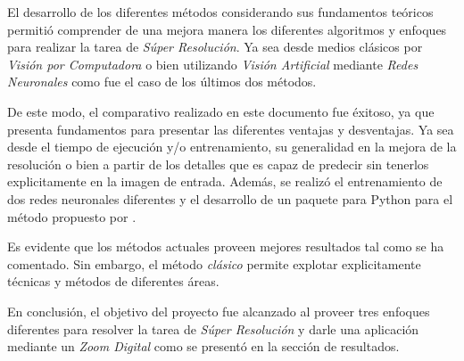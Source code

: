 \noindent
El desarrollo de los diferentes métodos considerando sus fundamentos teóricos
permitió comprender de una mejora manera los diferentes algoritmos y 
enfoques para realizar la tarea de \emph{Súper Resolución}. Ya sea desde
medios clásicos por \emph{Visión por Computadora} o bien utilizando 
\emph{Visión Artificial} mediante \emph{Redes Neuronales} como fue el 
caso de los últimos dos métodos. 

De este modo, el comparativo realizado en este documento fue éxitoso,
ya que presenta fundamentos para presentar las diferentes ventajas y 
desventajas. Ya sea desde el tiempo de ejecución y/o entrenamiento,
su generalidad en la mejora de la resolución o bien a partir de los 
detalles que es capaz de predecir sin tenerlos explicitamente en la 
imagen de entrada. Además, se realizó el entrenamiento de dos 
redes neuronales diferentes y el desarrollo de un paquete para Python
para el método propuesto por \cite{freeman}.

Es evidente que los métodos actuales proveen mejores resultados tal 
como se ha comentado. Sin embargo, el método \emph{clásico} permite 
explotar explicitamente técnicas y métodos de diferentes áreas.

En conclusión, el objetivo del proyecto fue alcanzado al proveer 
tres enfoques diferentes para resolver la tarea de \emph{Súper Resolución}
y darle una aplicación mediante un \emph{Zoom Digital} como se presentó en la
sección de resultados. 